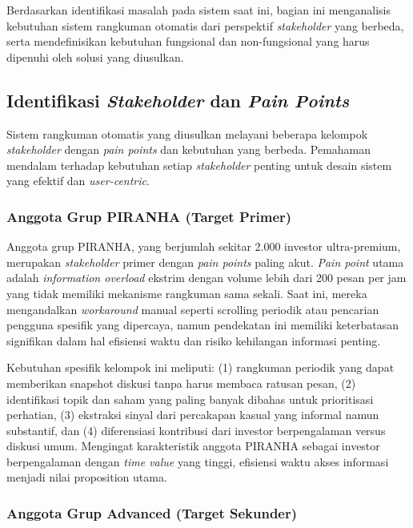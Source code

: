Berdasarkan identifikasi masalah pada sistem saat ini, bagian ini menganalisis kebutuhan sistem rangkuman otomatis dari perspektif \textit{stakeholder} yang berbeda, serta mendefinisikan kebutuhan fungsional dan non-fungsional yang harus dipenuhi oleh solusi yang diusulkan.

\subsection{Identifikasi \textit{Stakeholder} dan \textit{Pain Points}}

Sistem rangkuman otomatis yang diusulkan melayani beberapa kelompok \textit{stakeholder} dengan \textit{pain points} dan kebutuhan yang berbeda. Pemahaman mendalam terhadap kebutuhan setiap \textit{stakeholder} penting untuk desain sistem yang efektif dan \textit{user-centric}.

\subsubsection{Anggota Grup PIRANHA (Target Primer)}

Anggota grup PIRANHA, yang berjumlah sekitar 2.000 investor ultra-premium, merupakan \textit{stakeholder} primer dengan \textit{pain points} paling akut. \textit{Pain point} utama adalah \textit{information overload} ekstrim dengan volume lebih dari 200 pesan per jam yang tidak memiliki mekanisme rangkuman sama sekali. Saat ini, mereka mengandalkan \textit{workaround} manual seperti scrolling periodik atau pencarian pengguna spesifik yang dipercaya, namun pendekatan ini memiliki keterbatasan signifikan dalam hal efisiensi waktu dan risiko kehilangan informasi penting.

Kebutuhan spesifik kelompok ini meliputi: (1) rangkuman periodik yang dapat memberikan snapshot diskusi tanpa harus membaca ratusan pesan, (2) identifikasi topik dan saham yang paling banyak dibahas untuk prioritisasi perhatian, (3) ekstraksi sinyal dari percakapan kasual yang informal namun substantif, dan (4) diferensiasi kontribusi dari investor berpengalaman versus diskusi umum. Mengingat karakteristik anggota PIRANHA sebagai investor berpengalaman dengan \textit{time value} yang tinggi, efisiensi waktu akses informasi menjadi nilai proposition utama.

\subsubsection{Anggota Grup Advanced (Target Sekunder)}

